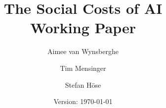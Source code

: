 \usepackage[T1]{fontenc}
\usepackage[utf8]{inputenc}
\usepackage[left=1in, right=1in, top=1in, bottom=1in]{geometry}
\usepackage[affil-it]{authblk}

\usepackage{amsmath}
\usepackage{amssymb}
\usepackage{hyperref}
\usepackage{mathpazo}
\usepackage{tgpagella}
\usepackage{xcolor}

\linespread{1.25}

\usepackage[backend=biber, style=ieee, autocite=inline, doi=false, url=true]{biblatex}
\setcounter{biburlnumpenalty}{85}  %

\renewcommand*{\bibfont}{\footnotesize}

\newcommand{\mycite}[1]{\citeauthor*{#1} (\citeyear{#1}, \cite{#1})}



\newcommand{\blue}[1]{\textcolor{bonnblue}{#1}}
\newcommand{\yellow}[1]{\textcolor{bonnyellow}{#1}}
\newcommand{\grey}[1]{\textcolor{bonngrey}{#1}}
\newcommand{\red}[1]{\textcolor{red}{#1}}

\renewcommand\thefootnote{\blue{\arabic{footnote}}}

\hypersetup{
    colorlinks=true,
    urlcolor=bonnblue,
    citecolor=bonnblue,
    allcolors=bonnblue,
}


\title{\textbf{The Social Costs of AI}\\
    \Large Working Paper
}
\date{Version: \today}
\author[1]{Aimee van Wynsberghe}
\author[2]{Tim Mensinger}
\author[3]{Stefan H{\"o}se}
